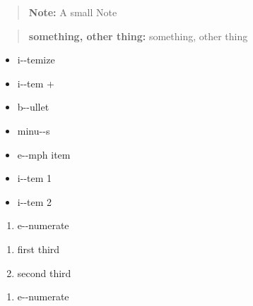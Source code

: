 \documentclass{book}
\begin{document}
\begin{quote}
\begin{footnotesize}
\textbf{Note:} A small Note
\end{footnotesize}
\end{quote}

\begin{quote}
\begin{footnotesize}
\textbf{something, other thing:} something, other thing
\end{footnotesize}
\end{quote}

\begin{itemize}
\item i{-}{-}temize
\end{itemize}

\begin{itemize}[label=+]
\item i{-}{-}tem +
\end{itemize}

\begin{itemize}[label=\textbullet{}]
\item b{-}{-}ullet
\end{itemize}

\begin{itemize}[label=-]
\item minu{-}{-}s
\end{itemize}

\begin{itemize}[label=\emph{after emph}]
\item e{-}{-}mph item
\end{itemize}

\begin{itemize}[label=\textbullet{} a{-}{-}n itemize line]
\item {}%
i{-}{-}tem 1
\item i{-}{-}tem 2
\end{itemize}

\begin{enumerate}[start=1]
\item e{-}{-}numerate
\end{enumerate}

\begin{enumerate}[start=3]
\item first third
\item second third
\end{enumerate}

\begin{enumerate}[label=\alph*.]
\item e{-}{-}numerate
\end{enumerate}
\end{document}
